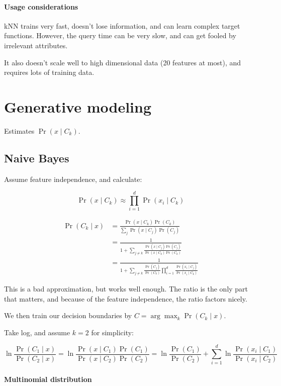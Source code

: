 \documentclass{idc_msc}
\begin{document}
\paragraph{Usage considerations}

kNN trains very fast, doesn't lose information, and can learn complex target functions.
However, the query time can be very slow, and can get fooled by irrelevant attributes.

It also doesn't scale well to high dimensional data (20 features at most), and requires lots of training data.


\clearpage
\section{Generative modeling}

Estimates \(\Pr(x \mid C_k)\).

\subsection{Naive Bayes}

Assume feature independence, and calculate:

\[\Pr(x \mid C_k) \approx \prod_{i=1}^d \Pr(x_i \mid C_k)\]

\[
\begin{aligned}
\Pr(C_k \mid x)
& = \frac{\Pr(x \mid C_k)\Pr(C_k)}{\sum_j \Pr(x \mid C_j)\Pr(C_j)} \\
& = \frac{1}{1 + \sum_{j \ne k} \frac{\Pr(x \mid C_j)\Pr(C_j)}{\Pr(x \mid C_k)\Pr(C_k)}} \\
& = \frac{1}{1 + \sum_{j \ne k} \frac{\Pr(C_j)}{\Pr(C_k)}\prod_{i=1}^d\frac{\Pr(x_i \mid C_j)}{\Pr(x_i \mid C_k)}}
\end{aligned}
\]

This is a bad approximation, but works well enough.
The ratio is the only part that matters, and because of the feature independence, the ratio factors nicely.

We then train our decision boundaries by \(C = \arg \max_k \Pr(C_k \mid x)\).

Take log, and assume \(k = 2\) for simplicity:

\[
\ln \frac{\Pr(C_1 \mid x)}{\Pr(C_2 \mid x)}
= \ln \frac{\Pr(x \mid C_1) \Pr(C_1)}{\Pr(x \mid C_2)\Pr(C_2)}
= \ln \frac{\Pr(C_1)}{\Pr(C_2)} + \sum_{i=1}^d \ln \frac{\Pr(x_i \mid C_1)}{\Pr(x_i \mid C_2)}
\]

\paragraph{Multinomial distribution}
\end{document}
